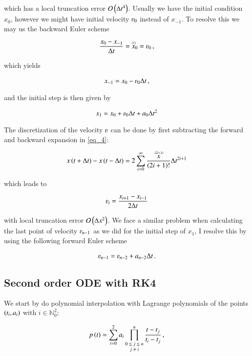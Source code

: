 \documentclass[11pt,english,a4paper]{article}
\begin{document}
\begin{flushleft}
which has a local truncation error $\mathcal{O}\p{\Delta t^4}$. Usually we have the initial condition $x_0$, however we might have initial velocity $\varv_0$ instead of $x_{-1}$. To resolve this we may us the backward Euler scheme

\begin{align*}
\frac{x_0 - x_{-1}}{\Delta t} = \T{x}{(1)}_0 = \varv_0 \,,
\end{align*}

which yields

\begin{align*}
x_{-1} = x_0 - \varv_0 \Delta t\,,
\end{align*}

and the initial step is then given by

\begin{align}
x_{1} = x_0 + \varv_{0}\Delta t + a_0 \Delta t^2
\label{eq_6}
\end{align}

The discretization of the velocity $\varv$ can be done by first subtracting the forward and backward expansion in \eqref{eq_4}:

\begin{align*}
x\p{t+\Delta t} - x\p{t-\Delta t} = 2\sum_{i=0}^{\infty} \frac{\T{x}{(2i+1)}}{\p{2i+1}!}\Delta t^{2i+1}
\end{align*}

which leads to

\begin{align}
\varv_i = \frac{x_{i+1}-x_{i-1}}{2\Delta t} 
\label{eq_7}
\end{align}

with local truncation error $\mathcal{O}\p{\Delta x^2}$. We face a similar problem when calculating the last point of velocity $\varv_{n-1}$ as we did for the initial step of $x_1$, I resolve this by using the following forward Euler scheme

\begin{align}
\varv_{n-1} = \varv_{n-2} + a_{n-2}\Delta t \,.
\label{eq_8}
\end{align}

\subsection{Second order ODE with RK4}

We start by do polynomial interpolation with Lagrange polynomials of the points $\p{t_i,a_i}$ with $i\in\mathbb{N}_0^2$; 

\begin{align*}
p\p{t} = \sum_{i=0}^2 a_i\prod_{\scriptsize\begin{matrix}0\leq j \leq n \\ j\neq i\end{matrix}}^n\frac{t-t_j}{t_i-t_j} \,,
\end{align*}


\end{flushleft}
\end{document}
